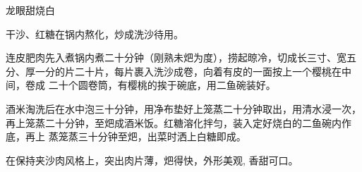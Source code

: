 \begin{recipe}{龙眼甜烧白}

\ingredients


\cooking

\step 干沙、红糖在锅内熬化，炒成洗沙待用。

\step 连皮肥肉先入煮锅内煮二十分钟（刚熟未𤆵为度），捞起晾冷，切成长三寸、宽五
分、厚一分的片二十片，每片裹入洗沙成卷，向着有皮的一面按上一个樱桃在中间，卷成
二十个圆卷筒，有樱桃的挨于碗底，用二鱼碗装好。

\step 酒米淘洗后在水中泡三十分钟，用净布垫好上笼蒸二十分钟取出，用清水浸一次，
再上笼蒸二十分钟，至𤆵成酒米饭。红糖溶化拌匀，装入定好烧白的二鱼碗内作底，再上
蒸笼蒸三十分钟至𤆵，出菜时洒上白糖即成。

\features

在保持夹沙肉风格上，突出肉片薄，𤆵得快，外形美观, 香甜可口。

\end{recipe}

